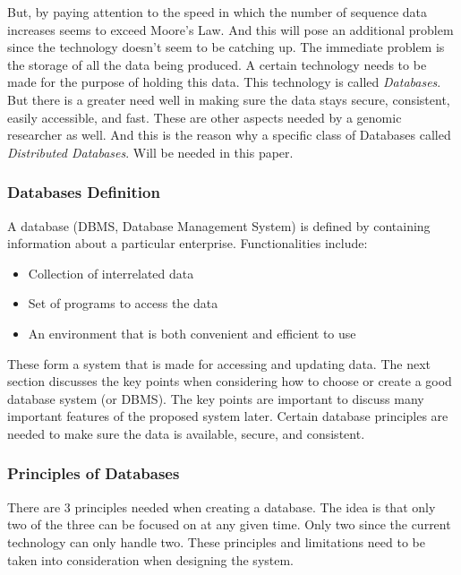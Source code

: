 \documentclass{article}
\begin{document}
But, by paying attention to the speed in which the number of sequence data increases seems to exceed Moore's Law. And this will pose an additional problem since the technology doesn't seem to be catching up. The immediate problem is the storage of all the data being produced. A certain technology needs to be made for the purpose of holding this data. This technology is called \textit{Databases}. But there is a greater need well in making sure the data stays secure, consistent, easily accessible, and fast. These are other aspects needed by a genomic researcher as well. And this is the reason why a specific class of Databases called \textit{Distributed Databases}. Will be needed in this paper.

\subsubsection{Databases Definition}
A database (DBMS, Database Management System) is defined by containing information about a particular enterprise. Functionalities include: \autocite{Silberschatz2010}
\begin{itemize}
    \item Collection of interrelated data
    \item Set of programs to access the data
    \item An environment that is both convenient and efficient to use
\end{itemize}

These form a system that is made for accessing and updating data. The next section discusses the key points when considering how to choose or create a good database system (or DBMS). The key points are important to discuss many important features of the proposed system later. Certain database principles are needed to make sure the data is available, secure, and consistent. 

\subsubsection{Principles of Databases} 
There are 3 principles needed when creating a database. The idea is that only two of the three can be focused on at any given time. Only two since the current technology can only handle two. These principles and limitations need to be taken into consideration when designing the system. \autocite{Silberschatz2010}
\end{document}
